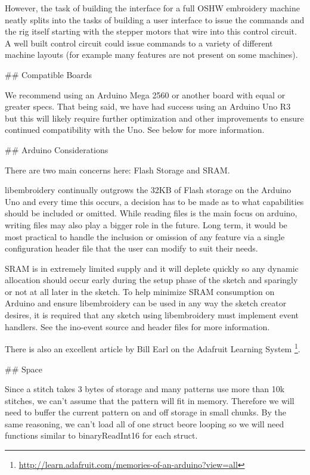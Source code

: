 However, the task of building the interface for a full OSHW embroidery machine
neatly splits into the tasks of building a user interface to issue the
commands and the rig itself starting with the stepper motors that wire into
this control circuit. A well built control circuit could issue commands to
a variety of different machine layouts (for example many features are not
present on some machines).

## Compatible Boards

We recommend using an Arduino Mega 2560 or another board with equal or
greater specs. That being said, we have had success using an Arduino Uno
R3 but this will likely require further optimization and other
improvements to ensure continued compatibility with the Uno. See below
for more information.

## Arduino Considerations

There are two main concerns here: Flash Storage and SRAM.

libembroidery continually outgrows the 32KB of Flash storage on the
Arduino Uno and every time this occurs, a decision has to be made as to
what capabilities should be included or omitted. While reading files is
the main focus on arduino, writing files may also play a bigger role
in the future. Long term, it would be most practical to handle the
inclusion or omission of any feature via a single configuration header
file that the user can modify to suit their needs.

SRAM is in extremely limited supply and it will deplete quickly so any
dynamic allocation should occur early during the setup phase of the
sketch and sparingly or not at all later in the sketch. To help minimize
SRAM consumption on Arduino and ensure libembroidery can be used in any
way the sketch creator desires, it is required that any sketch using
libembroidery must implement event handlers. See the ino-event source
and header files for more information.

There is also an excellent article by Bill Earl on the Adafruit Learning
System
\footnote{\url{http://learn.adafruit.com/memories-of-an-arduino?view=all}}.

## Space

Since a stitch takes 3 bytes of storage and many patterns use more than
10k stitches, we can't assume that the pattern will fit in memory. Therefore
we will need to buffer the current pattern on and off storage in small
chunks. By the same reasoning, we can't load all of one struct beore
looping so we will need functions similar to binaryReadInt16 for each
struct.

